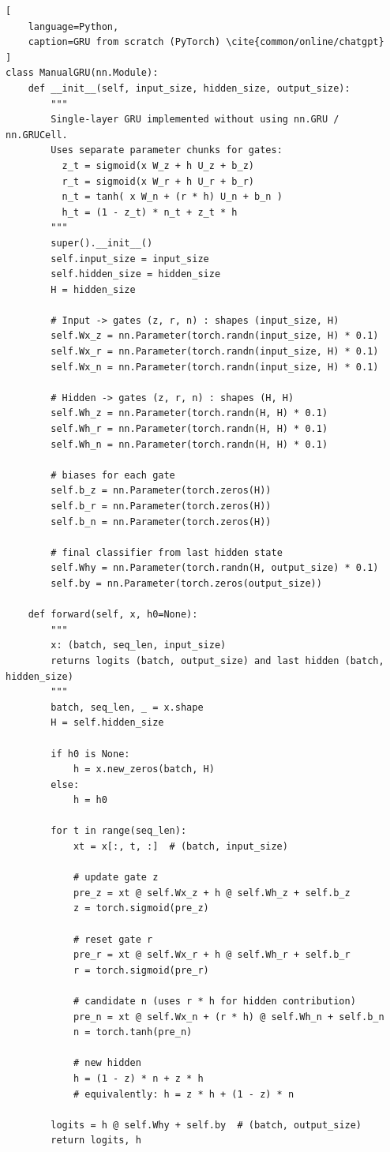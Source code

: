 \begin{lstlisting}[
    language=Python,
    caption=GRU from scratch (PyTorch) \cite{common/online/chatgpt}
]
class ManualGRU(nn.Module):
    def __init__(self, input_size, hidden_size, output_size):
        """
        Single-layer GRU implemented without using nn.GRU / nn.GRUCell.
        Uses separate parameter chunks for gates:
          z_t = sigmoid(x W_z + h U_z + b_z)
          r_t = sigmoid(x W_r + h U_r + b_r)
          n_t = tanh( x W_n + (r * h) U_n + b_n )
          h_t = (1 - z_t) * n_t + z_t * h
        """
        super().__init__()
        self.input_size = input_size
        self.hidden_size = hidden_size
        H = hidden_size

        # Input -> gates (z, r, n) : shapes (input_size, H)
        self.Wx_z = nn.Parameter(torch.randn(input_size, H) * 0.1)
        self.Wx_r = nn.Parameter(torch.randn(input_size, H) * 0.1)
        self.Wx_n = nn.Parameter(torch.randn(input_size, H) * 0.1)

        # Hidden -> gates (z, r, n) : shapes (H, H)
        self.Wh_z = nn.Parameter(torch.randn(H, H) * 0.1)
        self.Wh_r = nn.Parameter(torch.randn(H, H) * 0.1)
        self.Wh_n = nn.Parameter(torch.randn(H, H) * 0.1)

        # biases for each gate
        self.b_z = nn.Parameter(torch.zeros(H))
        self.b_r = nn.Parameter(torch.zeros(H))
        self.b_n = nn.Parameter(torch.zeros(H))

        # final classifier from last hidden state
        self.Why = nn.Parameter(torch.randn(H, output_size) * 0.1)
        self.by = nn.Parameter(torch.zeros(output_size))

    def forward(self, x, h0=None):
        """
        x: (batch, seq_len, input_size)
        returns logits (batch, output_size) and last hidden (batch, hidden_size)
        """
        batch, seq_len, _ = x.shape
        H = self.hidden_size

        if h0 is None:
            h = x.new_zeros(batch, H)
        else:
            h = h0

        for t in range(seq_len):
            xt = x[:, t, :]  # (batch, input_size)

            # update gate z
            pre_z = xt @ self.Wx_z + h @ self.Wh_z + self.b_z
            z = torch.sigmoid(pre_z)

            # reset gate r
            pre_r = xt @ self.Wx_r + h @ self.Wh_r + self.b_r
            r = torch.sigmoid(pre_r)

            # candidate n (uses r * h for hidden contribution)
            pre_n = xt @ self.Wx_n + (r * h) @ self.Wh_n + self.b_n
            n = torch.tanh(pre_n)

            # new hidden
            h = (1 - z) * n + z * h
            # equivalently: h = z * h + (1 - z) * n

        logits = h @ self.Why + self.by  # (batch, output_size)
        return logits, h
\end{lstlisting}


